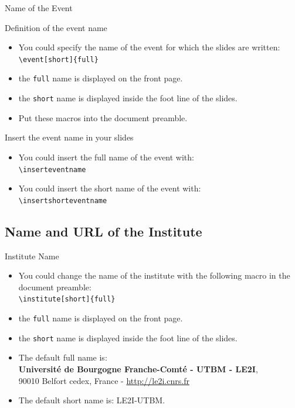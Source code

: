 \documentclass[english,sectioncirclenumberstyle]{le2iutbmbeamer}
\begin{document}
\begin{frame}[t]{Name of the Event}
	\begin{block}{Definition of the event name}
		\begin{itemize}
		\item You could specify the name of the event for which the slides are written: \\
			\texttt{{\textbackslash}event[short]\{full\}}
		\item the \texttt{full} name is displayed on the front page.
		\item the \texttt{short} name is displayed inside the foot line of the slides.
		\item Put these macros into the document preamble.
		\end{itemize}
	\end{block}
	\begin{block}{Insert the event name in your slides}
		\begin{itemize}
		\item You could insert the full name of the event with: \\
			\texttt{{\textbackslash}inserteventname}
		\item You could insert the short name of the event with: \\
			\texttt{{\textbackslash}insertshorteventname}
		\end{itemize}
	\end{block}
\end{frame}

\subsection{Name and URL of the Institute}
\begin{frame}{Institute Name}
	\begin{itemize}
	\item You could change the name of the institute with the following macro in the document preamble: \\
		\texttt{{\textbackslash}institute[short]\{full\}}
	\item the \texttt{full} name is displayed on the front page.
	\item the \texttt{short} name is displayed inside the foot line of the slides.
	\vspace{1em}
	\item The default full name is: \\
		\small\textbf{Universit\'e de Bourgogne Franche-Comt\'e - UTBM - LE2I}, \\
		\small90010 Belfort cedex, France - \url{http://le2i.cnrs.fr}
	\item The default short name is: LE2I-UTBM.
	\end{itemize}
\end{frame}
\end{document}
